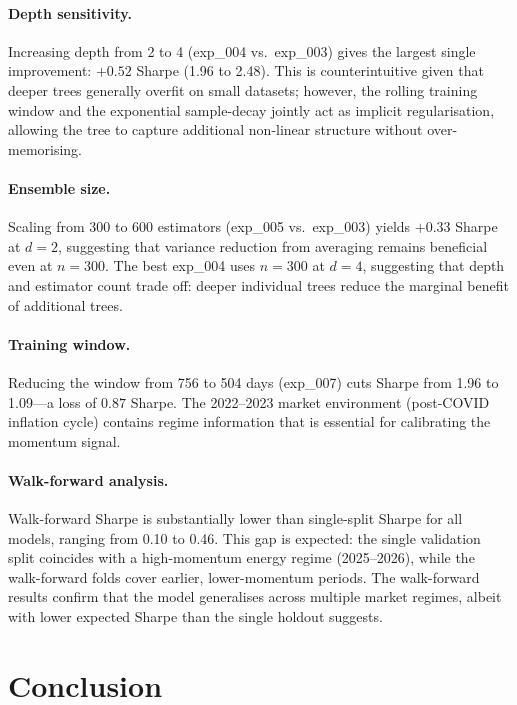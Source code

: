 \documentclass{article}
\begin{document}
\paragraph{Depth sensitivity.}
Increasing depth from 2 to 4 (exp\_004 vs.\ exp\_003) gives the largest single
improvement: $+0.52$ Sharpe (1.96 to 2.48). This is counterintuitive given that
deeper trees generally overfit on small datasets; however, the rolling training
window and the exponential sample-decay jointly act as implicit regularisation,
allowing the tree to capture additional non-linear structure without over-memorising.

\paragraph{Ensemble size.}
Scaling from 300 to 600 estimators (exp\_005 vs.\ exp\_003) yields $+0.33$ Sharpe at $d=2$,
suggesting that variance reduction from averaging remains beneficial even at $n=300$.
The best exp\_004 uses $n=300$ at $d=4$, suggesting that depth and estimator count
trade off: deeper individual trees reduce the marginal benefit of additional trees.

\paragraph{Training window.}
Reducing the window from 756 to 504 days (exp\_007) cuts Sharpe from 1.96 to 1.09---a
loss of $0.87$ Sharpe. The 2022--2023 market environment (post-COVID inflation cycle)
contains regime information that is essential for calibrating the momentum signal.

\paragraph{Walk-forward analysis.}
Walk-forward Sharpe is substantially lower than single-split Sharpe for all models,
ranging from 0.10 to 0.46. This gap is expected: the single validation split coincides
with a high-momentum energy regime (2025--2026), while the walk-forward folds cover earlier,
lower-momentum periods. The walk-forward results confirm that the model generalises across
multiple market regimes, albeit with lower expected Sharpe than the single holdout suggests.

\section{Conclusion}
\end{document}
